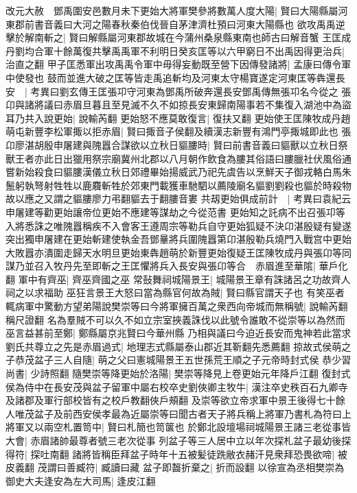 改元大赦　鄧禹圍安邑數月未下更始大將軍樊參將數萬人度大陽|{
	賢曰大陽縣屬河東郡前書音義曰大河之陽春秋秦伯伐晉自茅津濟杜預曰河東大陽縣也}
欲攻禹禹逆擊於解南斬之|{
	賢曰解縣屬河東郡故城在今蒲州桑泉縣東南也師古曰解音蟹}
王匡成丹劉均合軍十餘萬復共擊禹禹軍不利明日癸亥匡等以六甲窮日不出禹因得更治兵|{
	治直之翻}
甲子匡悉軍出攻禹禹令軍中毋得妄動既至營下因傳發諸將|{
	孟康曰傳令軍中使發也}
鼓而並進大破之匡等皆走禹追斬均及河東太守楊寶遂定河東匡等犇還長安　|{
	考異曰劉玄傳王匡張卭守河東為鄧禹所破奔還長安鄧禹傳無張卭名今從之}
張卬與諸將議曰赤眉旦暮且至見滅不久不如掠長安東歸南陽事若不集復入湖池中為盜耳乃共入說更始|{
	說輸芮翻}
更始怒不應莫敢復言|{
	復扶又翻}
更始使王匡陳牧成丹趙萌屯新豐李松軍掫以拒赤眉|{
	賢曰掫音子侯翻及續漢志新豐有鴻門亭掫城即此也}
張卬廖湛胡殷申屠建與隗囂合謀欲以立秋日貙膢時|{
	賢曰前書音義曰貙獸以立秋日祭獸王者亦此日出獵用祭宗廟冀州北郡以八月朝作飲食為膢其俗語曰膢臘社伏風俗通嘗新始殺食曰貙膢漢儀立秋日郊禮畢始揚威武乃祀先虞告以烹鮮天子御戎輅白馬朱鬛躬執弩射牲牲以鹿麛斬牲於郊東門載獲車馳駟以薦陵廟名貙劉劉殺也貙於時殺物故以應之又謂之貙膢廖力弔翻貙去于翻膢音婁}
共刼更始俱成前計　|{
	考異曰袁紀云申屠建等勸更始讓帝位更始不應建等謀劫之今從范書}
更始知之託病不出召張卭等入將悉誅之唯隗囂稱疾不入會客王遵周宗等勒兵自守更始狐疑不決卬湛殷疑有變遂突出獨申屠建在更始斬建使執金吾鄧曅將兵圍隗囂第卬湛殷勒兵燒門入戰宫中更始大敗囂亦潰圍走歸天水明旦更始東犇趙萌於新豐更始復疑王匡陳牧成丹與張卬等同謀乃並召入牧丹先至即斬之王匡懼將兵入長安與張卬等合　赤眉進至華隂|{
	華戶化翻}
軍中有齊巫|{
	齊巫齊國之巫}
常鼔舞祠城陽景王|{
	城陽景王章有誅諸呂之功故齊人祠之以求福助}
巫狂言景王大怒曰當為縣官何故為賊|{
	賢曰縣官謂天子也}
有笑巫者輒病軍中驚動方望弟陽說樊崇等曰今將軍擁百萬之衆西向帝城而無稱號|{
	說輸芮翻稱尺證翻}
名為羣賊不可以久不如立宗室挾義誅伐以此號令誰敢不從崇等以為然而巫言益甚前至鄭|{
	鄭縣屬京兆賢曰今華州縣}
乃相與議曰今迫近長安而鬼神若此當求劉氏共尊立之先是赤眉過式|{
	地理志式縣屬泰山郡近其靳翻先悉薦翻}
掠故式侯萌之子恭茂盆子三人自隨|{
	萌之父曰憲城陽景王五世孫荒王順之子元帝時封式侯}
恭少習尚書|{
	少詩照翻}
隨樊崇等降更始於洛陽|{
	樊崇等降見上卷更始元年降戶江翻}
復封式侯為侍中在長安茂與盆子留軍中屬右校卒史劉俠卿主牧牛|{
	漢注卒史秩百石九卿寺及諸郡及軍行部校皆有之校戶教翻俠戶頰翻}
及崇等欲立帝求軍中景王後得七十餘人唯茂盆子及前西安侯孝最為近屬崇等曰聞古者天子將兵稱上將軍乃書札為符曰上將軍又以兩空札置笥中|{
	賢曰札簡也笥箧也}
於鄭北設壇場祠城陽景王諸三老從事皆大會|{
	赤眉諸帥最尊者號三老次從事}
列盆子等三人居中立以年次探札盆子最幼後探得符|{
	探吐南翻}
諸將皆稱臣拜盆子時年十五被髪徒跣敝衣赭汗見衆拜恐畏欲啼|{
	被皮義翻}
茂謂曰善臧符|{
	臧讀曰藏}
盆子即齧折棄之|{
	折而設翻}
以徐宣為丞相樊崇為御史大夫逢安為左大司馬|{
	逢皮江翻}
